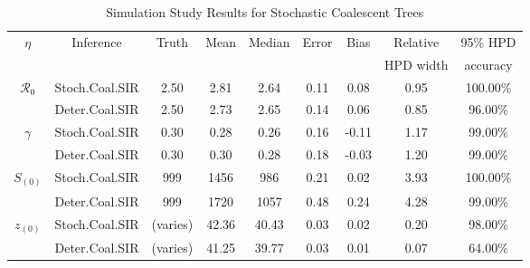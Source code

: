 \documentclass[10pt]{article}
\begin{document}
%
%
\begin{table}[!ht]
\begin{center}
\caption{\large{Simulation Study Results for Stochastic Coalescent Trees}}
\begin{tabular}{|c|c|c|c|c|c|c|c|c|}
\hline
$\eta$ & Inference & Truth & Mean & Median & Error & Bias & Relative & 95\% HPD \\ 
&  &  &  &  &  &  &  HPD width & accuracy \\ 
	\hline
	\hline
$\mathcal{R}_0$ & Stoch.Coal.SIR & 2.50 & 2.81 & 2.64 & 0.11 & 0.08 & 0.95 & 100.00\% \\
& Deter.Coal.SIR & 2.50 & 2.73 & 2.65 & 0.14 & 0.06 & 0.85 & 96.00\% \\
   \hline
   \hline 
$\gamma$ & Stoch.Coal.SIR & 0.30 & 0.28 & 0.26 & 0.16 & -0.11 & 1.17 & 99.00\% \\
& Deter.Coal.SIR & 0.30 & 0.30 & 0.28 & 0.18 & -0.03 & 1.20 & 99.00\% \\
   \hline
   \hline
$S_{(0)}$ & Stoch.Coal.SIR & 999 & 1456 & 986 & 0.21 & 0.02 & 3.93 & 100.00\% \\
& Deter.Coal.SIR & 999 & 1720 & 1057 & 0.48 & 0.24 & 4.28 & 99.00\% \\
   \hline
   \hline
$z_{(0)}$ & Stoch.Coal.SIR & (varies) & 42.36 & 40.43 & 0.03 & 0.02 & 0.20 & 98.00\% \\
& Deter.Coal.SIR & (varies) & 41.25 & 39.77 & 0.03 & 0.01 & 0.07 & 64.00\% \\ 
   \hline
\end{tabular}
\end{center}
\label{table:simStochCoalTrees}
 \end{table}
%
\clearpage
\end{document}

